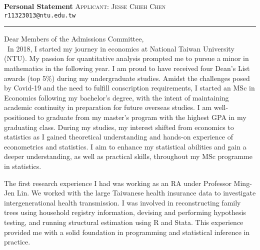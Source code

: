 \documentclass[a4paper]{article}
\begin{document}
\noindent
\textbf{Personal Statement}
\hfill
\textsc{Applicant: Jesse Chieh Chen}\\
\null\hfill{\footnotesize\texttt{r11323013@ntu.edu.tw}}\\
\unskip
\vspace{0.3em}
\hrule
\vspace{1em}

\noindent
Dear Members of the Admissions Committee,\\

\noindent
\unskip\
In 2018, I started my journey in economics at National Taiwan University (NTU).
My passion for quantitative analysis prompted me to pursue a minor in mathematics in the following year.
I am proud to have received four Dean's List awards (top 5\%) during my undergraduate studies.
Amidst the challenges posed by Covid-19 and the need to fulfill conscription requirements,
I started an MSc in Economics following my bachelor's degree,
with the intent of maintaining academic continuity in preparation for future overseas studies.
I am well-positioned to graduate from my master's program with the highest GPA in my graduating class.
During my studies, my interest shifted from economics to statistics as I gained theoretical understanding
and hands-on experience of econometrics and statistics.
I aim to enhance my statistical abilities and gain a deeper understanding,
as well as practical skills, throughout my MSc programme in statistics.

The first research experience I had was working as an RA under Professor Ming-Jen Lin.
We worked with the large Taiwanese health insurance data to investigate intergenerational health transmission.
I was involved in reconstructing family trees using household registry information,
devising and performing hypothesis testing, and running structural estimation using R and Stata.
This experience provided me with a solid foundation in programming and statistical inference in practice.

\end{document}
